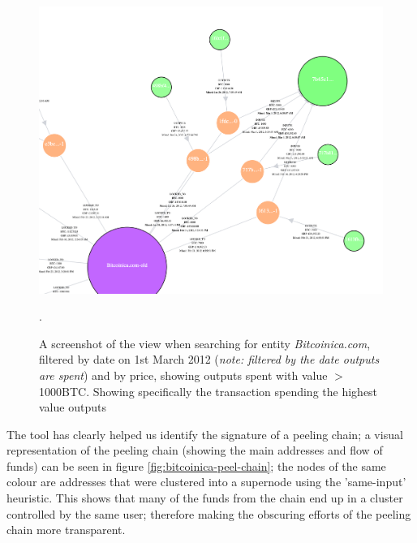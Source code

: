 \begin{figure}[h!]
  \centering
  \includegraphics[width = 15cm]{./figures/theft-high-value-tx}\\[0.5cm]
  \caption{A screenshot of the view when searching for entity \textit{Bitcoinica.com}, filtered by date on 1st March 2012 (\textit{note: filtered by the date outputs are spent}) and by price, showing outputs spent with value $>$ 1000BTC. Showing specifically the transaction spending the highest value outputs}.
  \label{fig:theft-highest-value-outputs}
\end{figure}

The tool has clearly helped us identify the signature of a peeling chain; a visual representation of the peeling chain (showing the main addresses and flow of funds) can be seen in figure \ref{fig:bitcoinica-peel-chain}; the nodes of the same colour are addresses that were clustered into a supernode using the 'same-input' heuristic. This shows that many of the funds from the chain end up in a cluster controlled by the same user; therefore making the obscuring efforts of the peeling chain more transparent. 


